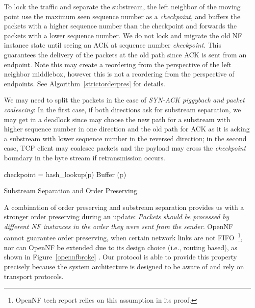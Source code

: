  
To lock the traffic and separate the substream, the left neighbor of the moving point use the maximum seen sequence number as a \textit{checkpoint}, and buffers the packets with a higher sequence number than the checkpoint and forwards the packets with a lower sequence number. We do not lock and migrate the old NF instance state until seeing an ACK at sequence number \textit{checkpoint}. This guarantees the delivery of the packets at the old path since ACK is sent from an endpoint. Note this may create a reordering from the perspective of the left neighbor middlebox, however this is not a reordering from the perspective of endpoints. See Algorithm~\ref{strictorderpres} for details. 

We may need to split the packets in the case of \textit{SYN-ACK piggyback and packet coalescing}: In the first case, if both directions ask for substream separation, we may get in a deadlock since \system may choose the new path for a substream with higher sequence number in one direction and the old path for ACK as it is acking a substream with lower sequence number in the reversed direction; in the second case, TCP client may coalesce packets and the payload  may cross the \textit{checkpoint} boundary in the byte stream if retransmission occurs. 

\begin{algorithm} [htbp]
\footnotesize
\SetAlgoLined
{}

 {
checkpoint = hash\_lookup(p)\;
 {
Buffer (p)\;
} 
} 







\caption{Substream Separation and Order Preserving} \label{strictorderpres}


\end{algorithm} 


A combination of order preserving and substream separation provides us with a stronger order preserving during an update: \textit{Packets should be processed by different NF instances in the order they were sent from the sender}. OpenNF cannot guarantee order preserving, when certain network links are not FIFO~\footnote{OpenNF tech report relies on this assumption in its proof.}, nor can OpenNF be extended due to its design choice (i.e., routing based), as shown in Figure~\ref{opennfbroke} . Our protocol is able to provide this property precisely because the system architecture is designed to be aware of and rely on transport protocols.



